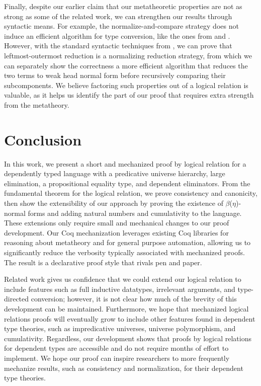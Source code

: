 \documentclass[\ifpublic nolinenum\else\fi,online,OA]{jfp}
\newcommand{\scw}[1]{}
\newcommand{\yl}[1]{}
\theoremstyle{definition}
\begin{document}
\ifextended
Finally, despite our earlier claim that our metatheoretic properties
are not as strong as some of the related work, we can strengthen our
results through syntactic means. For example, the
normalize-and-compare strategy does not induce an efficient algorithm
for type conversion, like the ones from \citet{decagda} and
\citet{martin-lof-a-la-coq}. However, with the standard syntactic
techniques from \citet{takahashi-parallel-reduction,
factorization-essentially}, we can prove that leftmost-outermost
reduction is a normalizing reduction strategy, from which we can
separately show the correctness a more efficient algorithm that
reduces the two terms to weak head normal form before recursively
comparing their subcomponents. We believe factoring such properties
out of a logical relation is valuable, as it helps us identify the
part of our proof that requires extra strength from the metatheory.
\scw{Why don't we just use leftmost-outermost reduction in the first place?
Do we even need nondeterministic parallel reduction?}
\yl{The conversion uses full reduction. Nondeterministic reduction
  makes it harder to show that convertible types have the same
  meaning. Maybe it would require us to prove factorization in our
  development but it definitely simplifies the determinism proof
  (confluence is no longer required before the fundamental
  lemma). }
\fi

\section{Conclusion}
\label{sec:conclusion}
In this work, we present a short and mechanized proof by logical relation for
a dependently typed language with a predicative universe hierarchy, large
elimination, a propositional equality type, and dependent eliminators.
From the fundamental theorem for the logical relation, we prove consistency
and canonicity, then show the extensibility of our approach by proving the
existence of $\beta$($\eta$)-normal forms and adding natural numbers and
cumulativity to the language. These extensions only require small and mechanical
changes to our proof development. Our Coq mechanization leverages existing Coq
libraries for reasoning about metatheory and for general purpose automation,
allowing us to significantly reduce the verbosity typically associated with
mechanized proofs. The result is a declarative proof style that rivals pen and paper.

Related work gives us confidence that we could extend our logical relation to
include features such as full inductive datatypes, irrelevant arguments, and
type-directed conversion; however, it is not clear how much of the brevity of
this development can be maintained. Furthermore, we hope that mechanized
logical relations proofs will eventually grow to include other features found
in dependent type theories, such as impredicative universes, universe
polymorphism, and cumulativity. Regardless, our development shows that proofs
by logical relations for dependent types are accessible and do not require
months of effort to implement. We hope our proof can inspire researchers to
more frequently mechanize results, such as consistency and normalization, for
their dependent type theories.




\label{lastpage}
\end{document}
